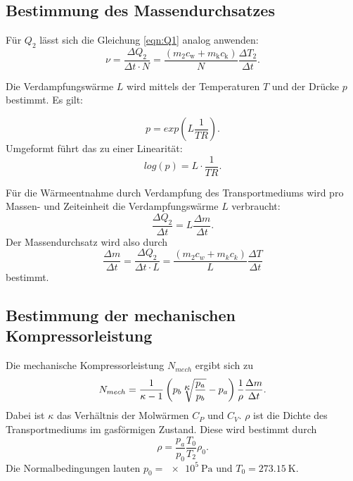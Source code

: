 \subsection{Bestimmung des Massendurchsatzes}
Für $Q_2$ lässt sich die Gleichung \ref{eqn:Q1} analog anwenden:
\begin{equation*}
    \nu = \frac{\Delta Q_2}{\Delta t \cdot N} = \frac{(m_2 c_\text{w} + m_\text{k} c_\text{k})}{N} \frac{\Delta T_2}{\Delta t}.
\end{equation*}

\noindent Die Verdampfungswärme $L$ wird mittels der Temperaturen $T$ und der Drücke $p$ bestimmt.
Es gilt: 

\begin{equation*}
    p = exp \left(L \frac{1}{TR} \right).
\end{equation*}
Umgeformt führt das zu einer Linearität:
\begin{equation*}
    log(p) = L \cdot \frac{1}{TR}.
\end{equation*}

\noindent Für die Wärmeentnahme durch Verdampfung des Transportmediums
wird pro Massen- und Zeiteinheit die Verdampfungswärme $L$ 
verbraucht:
\begin{equation*}
    \frac{\Delta Q_2}{\Delta t} = L \frac{\Delta m}{\Delta t}.
\end{equation*}
Der Massendurchsatz wird also durch
\begin{equation}
    \frac{\Delta m}{\Delta t} = \frac{\Delta Q_2}{\Delta t \cdot L} = \frac{(m_2 c_w + m_k c_k)}{L} \frac{\Delta T}{\Delta t} %
    \label{eqn:massendurchsatz}
\end{equation}
bestimmt.

\subsection{Bestimmung der mechanischen Kompressorleistung}
Die mechanische Kompressorleistung $N_{mech}$ ergibt sich zu
\begin{equation}
    N_{mech} = \frac{1}{\kappa - 1} \left(p_b \sqrt[\mathlarger{\mathlarger{\kappa}}]{\frac{p_a}{p_b}} - p_a\right)\frac{1}{\rho}\frac{\Delta m}{\Delta t}. %
    \label{eqn:nmech}
\end{equation}
Dabei ist $\kappa$ das Verhältnis der Molwärmen $C_P$ und $C_V$. $\rho$ ist die Dichte
des Transportmediums im gasförmigen Zustand. Diese wird bestimmt durch
\begin{equation}
    \rho = \frac{p_a}{p_0} \frac{T_0}{T_2} \rho_0.
    \label{eqn:dichte}
\end{equation}
Die Normalbedingungen lauten $p_0 = \SI{e5}{\pascal}$ und $T_0 = \SI{273.15}{\kelvin}$.
